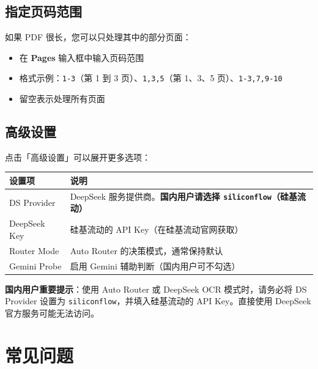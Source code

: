\documentclass[UTF8,zihao=-4,openany]{ctexbook}
\begin{document}
\section{指定页码范围}

如果 PDF 很长，您可以只处理其中的部分页面：

\begin{itemize}
	\item 在 \textbf{Pages} 输入框中输入页码范围
	\item 格式示例：\texttt{1-3}（第 1 到 3 页）、\texttt{1,3,5}（第 1、3、5 页）、\texttt{1-3,7,9-10}
	\item 留空表示处理所有页面
\end{itemize}

\section{高级设置}

点击「高级设置」可以展开更多选项：

\begin{center}
	\begin{tabular}{lp{9cm}}
		\toprule
		\textbf{设置项} & \textbf{说明}                                                \\
		\midrule
		DS Provider  & DeepSeek 服务提供商。\textbf{国内用户请选择 \texttt{siliconflow}（硅基流动）} \\
		DeepSeek Key & 硅基流动的 API Key（在硅基流动官网获取）                                   \\
		Router Mode  & Auto Router 的决策模式，通常保持默认                                   \\
		Gemini Probe & 启用 Gemini 辅助判断（国内用户可不勾选）                                   \\
		\bottomrule
	\end{tabular}
\end{center}

\begin{WarnBox}
	\textbf{国内用户重要提示}：使用 Auto Router 或 DeepSeek OCR 模式时，请务必将 DS Provider 设置为 \texttt{siliconflow}，并填入硅基流动的 API Key。直接使用 DeepSeek 官方服务可能无法访问。
\end{WarnBox}

\chapter{常见问题}
\end{document}
